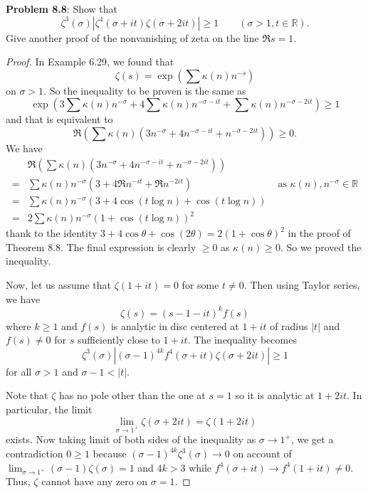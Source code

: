 \documentclass[12pt]{article}
\newcommand{\R}{\mathbb{R}}
\begin{document}
\fi

\textbf{Problem 8.8}: Show that
$$\zeta^3(\sigma)|\zeta^4(\sigma + it) \zeta(\sigma + 2it)| \geq 1 \qquad (\sigma > 1, t \in \R).$$
Give another proof of the nonvanishing of zeta on the line $\Re s = 1$.

\begin{proof}
In Example 6.29, we found that
$$\zeta(s) = \exp\left(\sum \kappa(n) n^{-s}\right)$$
on $\sigma > 1$. So the inequality to be proven is the same as
$$\exp\left(3 \sum \kappa(n) n^{-\sigma} + 4 \sum \kappa(n) n^{-\sigma-it} + \sum \kappa(n) n^{-\sigma-2it} \right) \geq 1$$
and that is equivalent to
$$\Re \left(\sum \kappa(n) (3 n^{-\sigma} + 4 n^{-\sigma-it} +  n^{-\sigma-2it}) \right) \geq 0.$$
We have
\begin{align*}
&\Re \left(\sum \kappa(n) (3 n^{-\sigma} + 4 n^{-\sigma-it} +  n^{-\sigma-2it}) \right) \\
= & \sum \kappa(n) n^{-\sigma} (3 + 4 \Re n^{-it} + \Re n^{-2it}) &\text{ as } \kappa(n), n^{-\sigma} \in \R \\
= & \sum \kappa(n) n^{-\sigma} (3 + 4 \cos(t \log n) + \cos(t \log n))\\
= & 2 \sum \kappa(n) n^{-\sigma} (1 + \cos(t \log n))^2
\end{align*}
thank to the identity $3 + 4\cos\theta + \cos(2\theta) = 2(1 + \cos \theta)^2$ in the proof of Theorem 8.8. The final expression is clearly $\geq 0$ as $\kappa(n) \geq 0$. So we proved the inequality.

Now, let us assume that $\zeta(1 + it) = 0$ for some $t \not= 0$. Then using Taylor series, we have
$$\zeta(s) = (s - 1 - it)^k f(s)$$
where $k \geq 1$ and $f(s)$ is analytic in disc centered at $1 + it$ of radius $|t|$ and $f(s) \not= 0$ for $s$ sufficiently close to $1 + it$. The inequality becomes
$$\zeta^3(\sigma)|(\sigma - 1)^{4k} f^4(\sigma + it) \zeta(\sigma + 2 it)| \geq 1$$
for all $\sigma > 1$ and $\sigma - 1 < |t|$.

Note that $\zeta$ has no pole other than the one at $s = 1$ so it is analytic at $1 + 2 it$. In particular, the limit
$$\lim_{\sigma \rightarrow 1^+} \zeta(\sigma + 2it) = \zeta(1 + 2it)$$
exists. Now taking limit of both sides of the inequality as $\sigma \rightarrow 1^+$, we get a contradiction $0 \geq 1$ because $(\sigma - 1)^{4k} \zeta^3(\sigma) \rightarrow 0$ on account of $\lim_{\sigma \rightarrow 1^+} (\sigma-1)\zeta(\sigma) = 1$ and $4k > 3$ while $f^4(\sigma + it) \rightarrow f^4(1 + it) \not= 0$. Thus, $\zeta$ cannot have any zero on $\sigma = 1$.
\end{proof}
\end{document}
